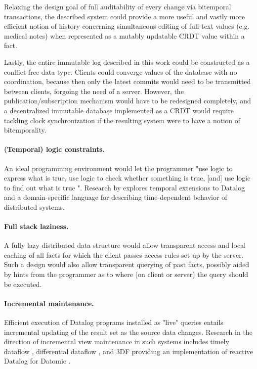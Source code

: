 Relaxing the design goal of full auditability of every change via bitemporal transactions, the described system could provide a more useful and vastly more efficient notion of history concerning simultaneous editing of full-text values (e.g. medical notes) when represented as a mutably updatable CRDT value within a fact.

Lastly, the entire immutable log described in this work could be constructed as a conflict-free data type. Clients could converge values of the database with no coordination, because then only the latest commits would need to be transmitted between clients, forgoing the need of a server. However, the publication/subscription mechanism would have to be redesigned completely, and a decentralized immutable database implemented as a CRDT would require tackling clock synchronization if the resulting system were to have a notion of bitemporality.


\cleardoublepage
\paragraph{(Temporal) logic constraints.} An ideal programming environment would let the programmer "use logic to express what is true, use logic to check whether something is true, [and] use logic to find out what is true \cite{sicp}". Research by \cite{alvaro2010dedalus,alvaro2011consistency} explores temporal extensions to Datalog and a domain-specific language for describing time-dependent behavior of distributed systems.

\paragraph{Full stack laziness.} A fully lazy distributed data structure would allow transparent access and local caching of all facts for which the client passes access rules set up by the server. Such a design would also allow transparent querying of past facts, possibly aided by hints from the programmer as to where (on client or server) the query should be executed.

\paragraph{Incremental maintenance.} Efficient execution of Datalog programs installed as "live" queries entails incremental updating of the result set as the source data changes.
Research in the direction of incremental view maintenance in such systems includes timely dataflow \cite{murray2013naiad}, differential dataflow \cite{mcsherry2013differential}, and 3DF providing an implementation of reactive Datalog for Datomic \cite{gobel2019optimising}.


